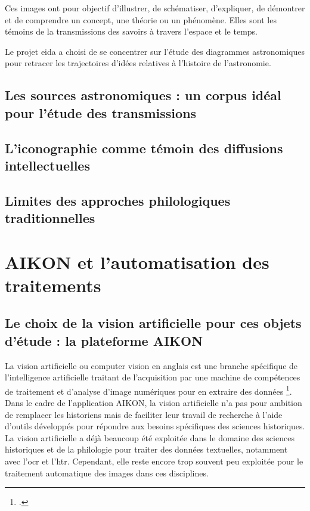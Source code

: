 \documentclass[a4paper,12pt,twoside]{book}
\newcommand{\clearemptydoublepage}{\newpage{\pagestyle{empty}\cleardoublepage}}
\begin{document}
	Ces images ont pour objectif d'illustrer, de schématiser, d'expliquer, de démontrer et de comprendre un concept, une théorie ou un phénomène. Elles sont les témoins de la transmissions des savoirs à travers l'espace et le temps.
	
	Le projet \gls{eida} a choisi de se concentrer sur l'étude des diagrammes astronomiques pour retracer les trajectoires d'idées relatives à l'histoire de l'astronomie. 
	
	\section[Un corpus idéal pour l'étude des transmissions]{Les sources astronomiques : un corpus idéal pour l'étude des transmissions}
	

	
	
	
	\section[L'iconographie témoin des diffusions intellectuelles]{L'iconographie comme témoin des diffusions intellectuelles}


	


	
	\section{Limites des approches philologiques traditionnelles}
	
	
	
	
	\clearemptydoublepage
	
	\chapter{AIKON et l'automatisation des traitements}
	
	\section{Le choix de la vision artificielle pour ces objets d'étude : la plateforme AIKON}
	
	La vision artificielle ou computer vision en anglais est \og une branche spécifique de l'intelligence artificielle traitant de l'acquisition par une machine de compétences de traitement et d'analyse d'image numériques pour en extraire des données \fg \footcite{norindrTraitementSourcesHistoriques2023}.
	Dans le cadre de l'application AIKON, la vision artificielle n'a pas pour ambition de remplacer les historiens mais de faciliter leur travail de recherche à l'aide d'outils développés pour répondre aux besoins spécifiques des sciences historiques. 
	La vision artificielle a déjà beaucoup été exploitée dans le domaine des sciences historiques et de la philologie pour traiter des données textuelles, notamment avec l'\gls{ocr} et l'\gls{htr}. Cependant, elle reste encore trop souvent peu exploitée pour le traitement automatique des images dans ces disciplines.
	
\end{document}
